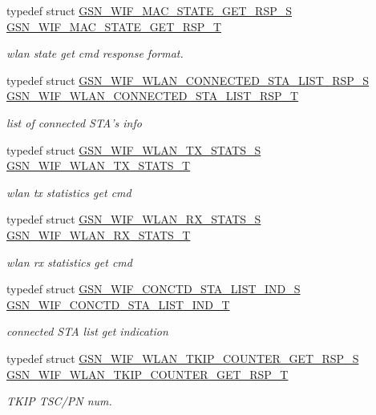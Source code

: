 \begin{DoxyCompactItemize}
typedef struct \hyperlink{a00341}{GSN\_\-WIF\_\-MAC\_\-STATE\_\-GET\_\-RSP\_\-S} \hyperlink{a00677_ga6dbab71e19ca02665a3be40e8850b059}{GSN\_\-WIF\_\-MAC\_\-STATE\_\-GET\_\-RSP\_\-T}
\begin{DoxyCompactList}\small\item\em wlan state get cmd response format. \end{DoxyCompactList}\item 
typedef struct \hyperlink{a00375}{GSN\_\-WIF\_\-WLAN\_\-CONNECTED\_\-STA\_\-LIST\_\-RSP\_\-S} \hyperlink{a00677_ga0cb3a8c19998e8db9e9251598e564b23}{GSN\_\-WIF\_\-WLAN\_\-CONNECTED\_\-STA\_\-LIST\_\-RSP\_\-T}
\begin{DoxyCompactList}\small\item\em list of connected STA's info \end{DoxyCompactList}\item 
typedef struct \hyperlink{a00410}{GSN\_\-WIF\_\-WLAN\_\-TX\_\-STATS\_\-S} \hyperlink{a00677_gadedc886d92dbab6910156f707795905d}{GSN\_\-WIF\_\-WLAN\_\-TX\_\-STATS\_\-T}
\begin{DoxyCompactList}\small\item\em wlan tx statistics get cmd \end{DoxyCompactList}\item 
typedef struct \hyperlink{a00398}{GSN\_\-WIF\_\-WLAN\_\-RX\_\-STATS\_\-S} \hyperlink{a00677_ga1bb08fff4c3ba2c6027ad054755e4df2}{GSN\_\-WIF\_\-WLAN\_\-RX\_\-STATS\_\-T}
\begin{DoxyCompactList}\small\item\em wlan rx statistics get cmd \end{DoxyCompactList}\item 
typedef struct \hyperlink{a00321}{GSN\_\-WIF\_\-CONCTD\_\-STA\_\-LIST\_\-IND\_\-S} \hyperlink{a00677_ga7709929fb1c332b2853a998d3b305561}{GSN\_\-WIF\_\-CONCTD\_\-STA\_\-LIST\_\-IND\_\-T}
\begin{DoxyCompactList}\small\item\em connected STA list get indication \end{DoxyCompactList}\item 
typedef struct \hyperlink{a00407}{GSN\_\-WIF\_\-WLAN\_\-TKIP\_\-COUNTER\_\-GET\_\-RSP\_\-S} \hyperlink{a00677_ga4c920262f319d5fe619f45ee687d827b}{GSN\_\-WIF\_\-WLAN\_\-TKIP\_\-COUNTER\_\-GET\_\-RSP\_\-T}
\begin{DoxyCompactList}\small\item\em TKIP TSC/PN num. \end{DoxyCompactList}\item 

\end{DoxyCompactItemize}
